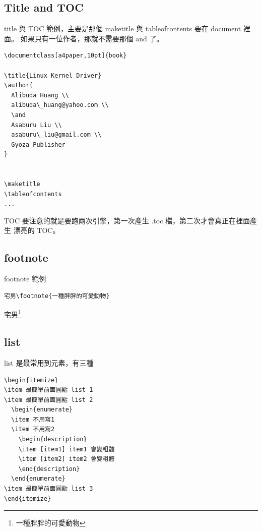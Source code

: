 \subsection{Title and TOC}
title 與 TOC 範例，主要是那個 maketitle 與 tableofcontents 要在 document 裡面。
如果只有一位作者，那就不需要那個 and 了。
\begin{verbatim}
\documentclass[a4paper,10pt]{book}

\title{Linux Kernel Driver}
\author{
  Alibuda Huang \\
  alibuda\_huang@yahoo.com \\
  \and 
  Asaburu Liu \\
  asaburu\_liu@gmail.com \\
  Gyoza Publisher
}


\maketitle
\tableofcontents
...

\end{verbatim}
TOC 要注意的就是要跑兩次引擎，第一次產生 .toc 檔，第二次才會真正在裡面產生
漂亮的 TOC。
\subsection{footnote}
footnote 範例
\begin{verbatim}
宅男\footnote{一種胖胖的可愛動物}
\end{verbatim}
宅男\footnote{一種胖胖的可愛動物}
\subsection{list}
list 是最常用到元素，有三種
\begin{verbatim}
\begin{itemize}
\item 最簡單前面圓點 list 1
\item 最簡單前面圓點 list 2
  \begin{enumerate}
  \item 不用寫1
  \item 不用寫2
    \begin{description}
    \item [item1] item1 會變粗體
    \item [item2] item2 會變粗體
    \end{description}
  \end{enumerate}
\item 最簡單前面圓點 list 3
\end{itemize}
\end{verbatim}
